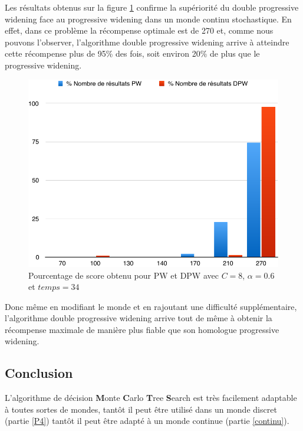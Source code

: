 \documentclass[pdftex,french, english]{article}	%
\begin{document}
    Les résultats obtenus sur la figure \ref{fig:comparatif_resultat_final_en_pourcent_monde 2} confirme la supériorité du double progressive widening face au progressive widening dans un monde continu stochastique. En effet, dans ce problème la récompense optimale est de 270 et, comme nous pouvons l'observer, l'algorithme double progressive widening arrive à atteindre cette récompense plus de 95\% des fois, soit environ 20\% de plus que le progressive widening.
    
      \begin{figure}[H]
		\centering
		\includegraphics[width=\textwidth]{comparatif_resultat_final_en_pourcent_monde2.pdf}
		\caption{Pourcentage de score obtenu pour PW et DPW avec $C = 8$, $\alpha = 0.6$ et $temps = 34$}
		 \label{fig:comparatif_resultat_final_en_pourcent_monde 2}
	\end{figure}
    
    Donc même en modifiant le monde et en rajoutant une difficulté supplémentaire, l'algorithme double progressive widening arrive tout de même à obtenir la récompense maximale de manière plus fiable que son homologue progressive widening.
    

\subsection{Conclusion}

L'algorithme de décision \textbf{M}onte \textbf{C}arlo \textbf{T}ree \textbf{S}earch \cite{coulom01} est très facilement adaptable à toutes sortes de mondes, tantôt il peut être utilisé dans un monde discret (partie \ref{P4}) tantôt il peut être adapté à un monde continue (partie \ref{continu}).
\end{document}
